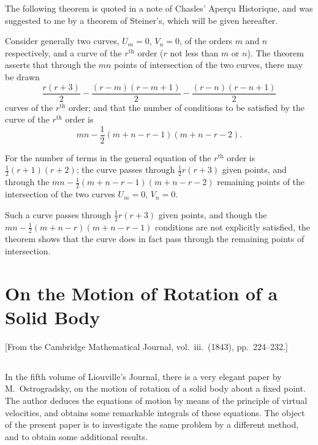 \documentclass[11pt,a4paper]{book}
\begin{document}
The following theorem is quoted in a note of Chasles' Aper\c{c}u Historique, and was suggested to me by a theorem of Steiner's, which will be given hereafter.

Consider generally two curves, $U_m = 0$, $V_n = 0$, of the orders $m$ and $n$ respectively, and a curve of the $r^{\text{th}}$ order ($r$ not less than $m$ or $n$). The theorem asserts that through the $mn$ points of intersection of the two curves, there may be drawn
\[
\frac{r(r+3)}{2} - \frac{(r-m)(r-m+1)}{2} - \frac{(r-n)(r-n+1)}{2}
\]
curves of the $r^{\text{th}}$ order; and that the number of conditions to be satisfied by the curve of the $r^{\text{th}}$ order is
\[
mn - \frac{1}{2}(m + n - r - 1)(m + n - r - 2).
\]

For the number of terms in the general equation of the $r^{\text{th}}$ order is $\frac{1}{2}(r+1)(r+2)$; the curve passes through $\frac{1}{2}r(r+3)$ given points, and through the $mn - \frac{1}{2}(m+n-r-1)(m+n-r-2)$ remaining points of the intersection of the two curves $U_m = 0$, $V_n = 0$.

Such a curve passes through $\frac{1}{2}r(r+3)$ given points, and though the $mn - \frac{1}{2}(m+n-r)(m+n-r-1)$ conditions are not explicitly satisfied, the theorem shows that the curve does in fact pass through the remaining points of intersection.

\cleardoublepage

\chapter{On the Motion of Rotation of a Solid Body}
\label{chap:paper6}

\begin{center}
\small[From the Cambridge Mathematical Journal, vol.~iii.\ (1843), pp.~224--232.]
\end{center}

\section*{}

In the fifth volume of Liouville's Journal, there is a very elegant paper by M.~Ostrogradsky, on the motion of rotation of a solid body about a fixed point. The author deduces the equations of motion by means of the principle of virtual velocities, and obtains some remarkable integrals of these equations. The object of the present paper is to investigate the same problem by a different method, and to obtain some additional results.
\end{document}
